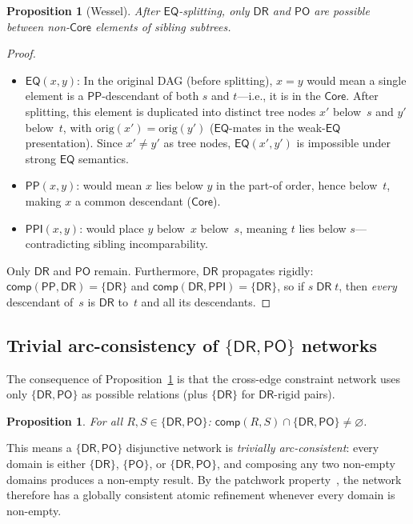 \documentclass[
]{ceurart}
\newtheorem{proposition}[theorem]{Proposition}
\theoremstyle{definition}
\newcommand{\DR}{\ensuremath{\mathsf{DR}}}
\newcommand{\PO}{\ensuremath{\mathsf{PO}}}
\newcommand{\EQ}{\ensuremath{\mathsf{EQ}}}
\newcommand{\PP}{\ensuremath{\mathsf{PP}}}
\newcommand{\PPI}{\ensuremath{\mathsf{PPI}}}
\newcommand{\comp}{\ensuremath{\mathsf{comp}}}
\newcommand{\Core}{\ensuremath{\mathsf{Core}}}
\begin{document}
\begin{proposition}[Wessel]
\label{prop:dr-rigid}
After $\EQ$-splitting, only $\DR$ and $\PO$ are possible between
non-$\Core$ elements of sibling subtrees.
\end{proposition}

\begin{proof}
\begin{itemize}[nosep]
  \item $\EQ(x,y)$: In the original DAG (before splitting),
    $x = y$ would mean a single element is a $\PP$-descendant of
    both $s$ and $t$---i.e., it is in the $\Core$.
    After splitting, this element is duplicated into
    distinct tree nodes $x'$ below~$s$ and $y'$ below~$t$,
    with $\mathrm{orig}(x') = \mathrm{orig}(y')$
    ($\EQ$-mates in the weak-$\EQ$ presentation).
    Since $x' \neq y'$ as tree nodes, $\EQ(x',y')$ is
    impossible under strong $\EQ$ semantics.
  \item $\PP(x,y)$: would mean $x$ lies below $y$ in the part-of
    order, hence below~$t$, making $x$ a common descendant
    ($\Core$).
  \item $\PPI(x,y)$: would place $y$ below~$x$ below~$s$, meaning
    $t$ lies below $s$---contradicting sibling incomparability.
\end{itemize}
Only $\DR$ and $\PO$ remain.  Furthermore, $\DR$ propagates
rigidly: $\comp(\PP, \DR) = \{\DR\}$ and $\comp(\DR, \PPI) = \{\DR\}$,
so if $s \;\DR\; t$, then \emph{every} descendant of~$s$ is $\DR$
to~$t$ and all its descendants.
\end{proof}

\subsection{Trivial arc-consistency of $\{\DR,\PO\}$ networks}

The consequence of Proposition~\ref{prop:dr-rigid} is that the
cross-edge constraint network uses only $\{\DR, \PO\}$ as possible
relations (plus $\{\DR\}$ for $\DR$-rigid pairs).

\begin{proposition}
\label{prop:drpo-arc}
For all $R, S \in \{\DR, \PO\}$:
$\comp(R, S) \cap \{\DR, \PO\} \neq \varnothing$.
\end{proposition}

This means a $\{\DR,\PO\}$ disjunctive network is
\emph{trivially arc-consistent}: every domain is either
$\{\DR\}$, $\{\PO\}$, or $\{\DR,\PO\}$, and composing any two
non-empty domains produces a non-empty result.
By the patchwork property~\cite{RenzNebel1999}, the network
therefore has a globally consistent atomic refinement whenever
every domain is non-empty.
\end{document}

